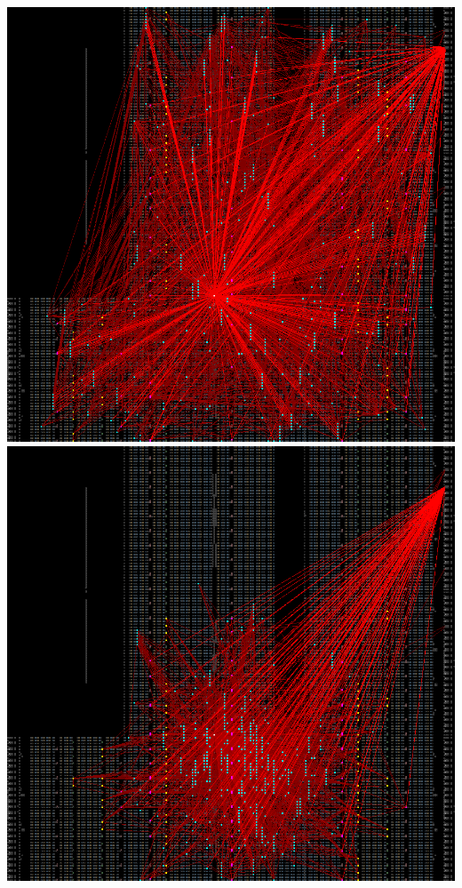 {
    \centering
    \includegraphics[valign=t, scale=0.13]{figures/results/PlacerGreedyRandom/random_placement.png}
    \includegraphics[valign=t, scale=0.13]{figures/results/PlacerGreedyRandom/00000010.png}
}
